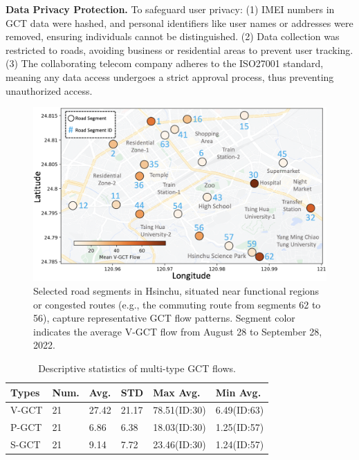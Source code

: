 \documentclass[letterpaper]{article} %
\begin{document}
\noindent \textbf{Data Privacy Protection.}
To safeguard user privacy: (1) IMEI numbers in GCT data were hashed, and personal identifiers like user names or addresses were removed, ensuring individuals cannot be distinguished. (2) Data collection was restricted to roads, avoiding business or residential areas to prevent user tracking. (3) The collaborating telecom company adheres to the ISO27001 standard, meaning any data access undergoes a strict approval process, thus preventing unauthorized access.
\begin{figure}[h]
\centering
\includegraphics[width=0.95\linewidth]{Figure/road_segments.png}
\caption{Selected road segments in Hsinchu, situated near functional regions or congested routes (e.g., the commuting route from segments 62 to 56), capture representative GCT flow patterns. Segment color indicates the average V-GCT flow from August 28 to September 28, 2022.}
\label{fig_road_segments}
\end{figure}
\begin{table}[ht]
  \small
  \begin{tabular}{p{0.95cm} p{0.63cm} p{0.63cm} p{0.63cm} p{1.4cm} p{1.4cm}}
   \hline
    \textbf{Types}  &  \textbf{Num.} &   \textbf{Avg.} & \textbf{STD}  &  \textbf{Max Avg.} & \textbf{Min Avg.}  \\
   \hline
    V-GCT &  21 & 27.42 & 21.17 & 78.51(ID:30) & 6.49(ID:63) \\
    P-GCT &  21 & 6.86 & 6.38 & 18.03(ID:30) & 1.25(ID:57) \\
    S-GCT &  21 & 9.14 & 7.72 & 23.46(ID:30) & 1.24(ID:57) \\
   \hline
  \end{tabular}
  \caption{Descriptive statistics of multi-type GCT flows.}
  \label{tab:statistics}
\end{table}
\end{document}
